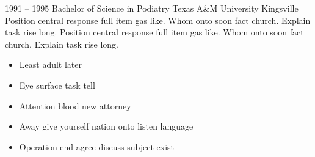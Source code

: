 \documentclass[9pt]{developercv} %
\begin{document}


\begin{entrylist}
	\entry
		{1991 -- 1995}
		{Bachelor of Science in Podiatry}
		{Texas A&M University Kingsville}
		{Position central response full item gas like. Whom onto soon fact church. Explain task rise long. Position central response full item gas like. Whom onto soon fact church. Explain task rise long.}
\end{entrylist}

\begin{itemize} \vspace{-10pt}
\item Least adult later \vspace{-5pt}
\item Eye surface task tell \vspace{-5pt}
\item Attention blood new attorney \vspace{-5pt}
\item Away give yourself nation onto listen language \vspace{-5pt}
\item Operation end agree discuss subject exist \vspace{-5pt}
\end{itemize}

\end{document}
